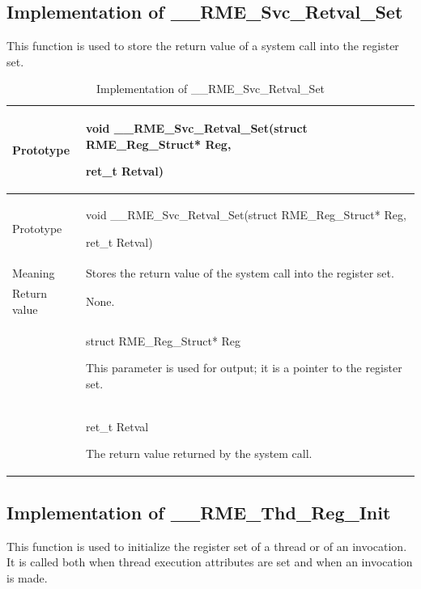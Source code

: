 \subsection{Implementation of \_\_RME\_Svc\_Retval\_Set}\label{subsec:7-rme-svc-retval-set-implementation}

This function is used to store the return value of a system call into the register set.

\begin{xltabular}{\textwidth}{@{}>{\hsize\raggedright\arraybackslash}X>{\hsize\raggedright\arraybackslash}X@{}}
\caption{Implementation of \_\_RME\_Svc\_Retval\_Set}\label{tab:7-62-rme-svc-retval-set-implementation}\\
\toprule
Prototype\strut
 & void \_\_RME\_Svc\_Retval\_Set(struct RME\_Reg\_Struct* Reg,

ret\_t Retval)\strut
\tabularnewline
\endfirsthead
\toprule
Prototype\strut
 & void \_\_RME\_Svc\_Retval\_Set(struct RME\_Reg\_Struct* Reg,

ret\_t Retval)\strut
\tabularnewline
\midrule
\endhead
\bottomrule
\endlastfoot
Meaning & Stores the return value of the system call into the register set.\tabularnewline
Return value & None.\tabularnewline
{} & struct RME\_Reg\_Struct* Reg

This parameter is used for output; it is a pointer to the register set.\strut
\tabularnewline
\strut
 & ret\_t Retval

The return value returned by the system call.\strut
\tabularnewline
\end{xltabular}
\nopagebreak[4]

\subsection{Implementation of \_\_RME\_Thd\_Reg\_Init}\label{subsec:7-rme-thd-reg-init-implementation}

This function is used to initialize the register set of a thread or of an invocation. It is called both when thread execution attributes are set and when an invocation is made.

